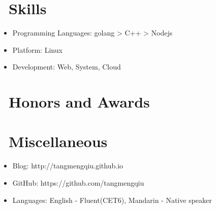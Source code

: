 \documentclass{resume}
\begin{document}

\section{\faCogs\ Skills}
\begin{itemize}[parsep=0.5ex]
  \item Programming Languages: golang  > C++ > Nodejs
  \item Platform: Linux
  \item Development: Web, System, Cloud
\end{itemize}

\section{\faHeartO\ Honors and Awards}

\section{\faInfo\ Miscellaneous}
\begin{itemize}[parsep=0.5ex]
  \item Blog: http://tangmengqiu.github.io
  \item GitHub: https://github.com/tangmengqiu
  \item Languages: English - Fluent(CET6), Mandarin - Native speaker
\end{itemize}

%
%
\end{document}
